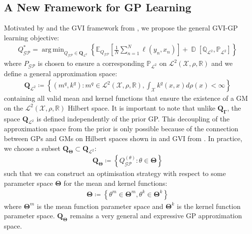 \documentclass{article}
\newcommand{\D}{\operatorname{\mathbb{D}}}
\newcommand{\GP}{\operatorname{\mathcal{GP}}}
\DeclareMathOperator*{\argmin}{arg\,min}
\numberwithin{equation}{section}
\begin{document}
\subsection{A New Framework for GP Learning}
Motivated by \cite{wild2022generalized} and the GVI framework from \cite{knoblauch2022optimization}, we propose the general GVI-GP learning objective:
\begin{align}
Q_{\GP}^* = \argmin_{Q_{\GP} \in \boldsymbol{Q}_{\mathcal{L}^2}} \left\{ \mathbb{E}_{Q_{\GP}}\left[\frac{1}{N}\sum_{n=1}^N \ell(y_n, x_n)\right] + \D\left[\mathbb{Q}_{\mathcal{L}^2}, \mathbb{P}_{\mathcal{L}^2}\right]\right\}
\label{gvi-gp-objective}
\end{align}
where $P_{\GP}$ is chosen to ensure a corresponding $\mathbb{P}_{\mathcal{L}^2}$ on $\mathcal{L}^2(\mathcal{X}, \rho, \mathbb{R})$ and we define a general approximation space:
\begin{align}
    \boldsymbol{Q}_{\mathcal{L}^2} \coloneqq \left\{ 
    \left(m^q, k^q\right): m^q \in \mathcal{L}^2(\mathcal{X}, \rho, \mathbb{R}), \int_{\mathcal{X}} k^q(x, x)d\rho(x) < \infty
    \right\}
\end{align}
containing all valid mean and kernel functions that ensure the existence of a GM on the $\mathcal{L}^2(\mathcal{X}, \rho, \mathbb{R})$ Hilbert space. It is important to note that unlike $\boldsymbol{Q}_{\boldsymbol{\Gamma}}$, the space $\boldsymbol{Q}_{\mathcal{L}^2}$ is defined independently of the prior GP. This decoupling of the approximation space from the prior is only possible because of the connection between GPs and GMs on Hilbert spaces shown in \cite{wild2022generalized} and GVI from \cite{knoblauch2022optimization}. In practice, we choose a subset $\boldsymbol{Q}_{\boldsymbol{\Theta}} \subset \boldsymbol{Q}_{\mathcal{L}^2}$:
\begin{align}
    \boldsymbol{Q}_{\boldsymbol{\Theta}} \coloneqq \left\{ 
    Q^{(\theta)}_{\GP}: \theta \in \boldsymbol{\Theta}
    \right\}
\end{align}
such that we can construct an optimisation strategy with respect to some parameter space $\boldsymbol{\Theta}$ for the mean and kernel functions:
\begin{align}
    \boldsymbol{\Theta} \coloneqq \left\{\theta^m \in \boldsymbol{\Theta}^m, \theta^k \in \boldsymbol{\Theta}^k \right\}
\end{align}
where $\boldsymbol{\Theta}^m$ is the mean function parameter space and $\boldsymbol{\Theta}^k$ is the kernel function parameter space. $\boldsymbol{Q}_{\boldsymbol{\Theta}}$ remains a very general and expressive GP approximation space. 
\end{document}
